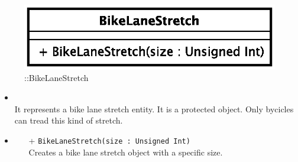 \begin{figure}[h]
\centering
\includegraphics[scale=0.6,keepaspectratio]{images/solution/bike_lane_stretch.eps}
\caption{\pReactiveComponentStretch::BikeLaneStretch}
\label{fig:sd-app-bike_lane_stretch}
\end{figure}
\FloatBarrier
\begin{itemize}
  \item \textbf{\descr} \\
    It represents a bike lane stretch entity. It is a protected object. Only bycicles 
can tread this kind of stretch.
  \item \textbf{\ops}
  \begin{itemize}
    \item[+] \texttt{BikeLaneStretch(size : Unsigned Int)} \\
        Creates a bike lane stretch object with a specific size.
  \end{itemize}
\end{itemize}
